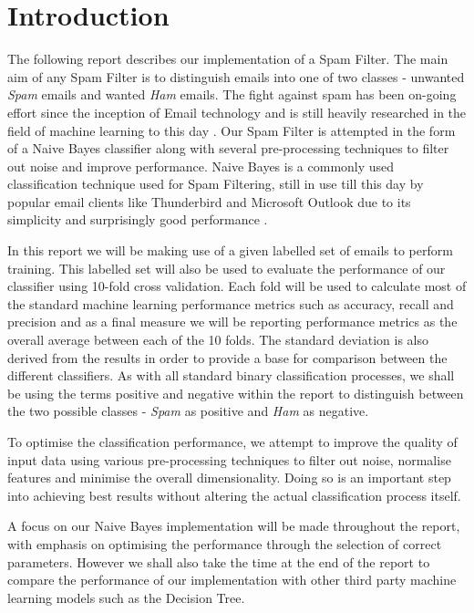 \section{Introduction}
The following report describes our implementation of a Spam Filter. The main aim of any Spam Filter is to distinguish emails into one of two classes - unwanted \emph{Spam} emails and wanted \emph{Ham} emails. The fight against spam has been on-going effort since the inception of Email technology and is still heavily researched in the field of machine learning to this day . Our Spam Filter is attempted in the form of a Naive Bayes classifier along with several pre-processing techniques to filter out noise and improve performance. Naive Bayes is a commonly used classification technique used for Spam Filtering, still in use till this day by popular email clients like Thunderbird and Microsoft Outlook due to its simplicity and surprisingly good performance .

In this report we will be making use of a given labelled set of emails to perform training. 
This labelled set will also be used to evaluate the performance of our classifier using 10-fold cross validation. 
Each fold will be used to calculate most of the standard machine learning performance metrics such as accuracy, recall and precision and as a final measure we will be reporting performance metrics as the overall average between each of the 10 folds. 
The standard deviation is also derived from the results in order to provide a base for comparison between the different classifiers.
As with all standard binary classification processes, we shall be using the terms positive and negative within the report to distinguish between the two possible classes - \emph{Spam} as positive and \emph{Ham} as negative.

To optimise the classification performance, we attempt to improve the quality of input data using various pre-processing techniques to filter out noise, normalise features and minimise the overall dimensionality. Doing so is an important step into achieving best results without altering the actual classification process itself.

A focus on our Naive Bayes implementation will be made throughout the report, with emphasis on optimising the performance through the selection of correct parameters.
However we shall also take the time at the end of the report to compare the performance of our implementation with other third party machine learning models such as the Decision Tree.


